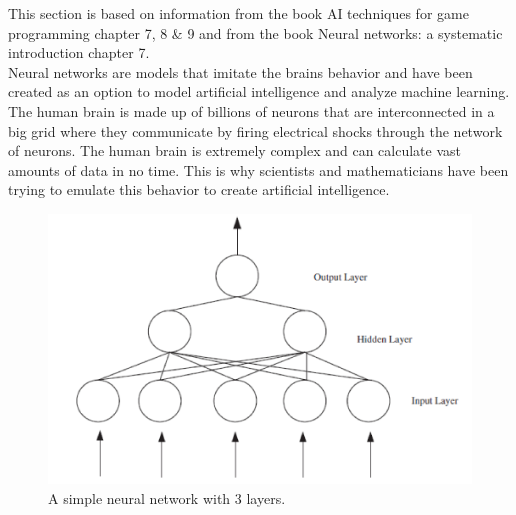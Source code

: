 This section is based on information from the book AI techniques for game programming\cite{buckland2002ai} chapter 7, 8 \& 9 and from the book Neural networks: a systematic introduction\cite{rojas1996neural} chapter 7.
\\[0.5cm]
Neural networks are models that imitate the brains behavior and have been created as an option to model artificial intelligence and analyze machine learning. The human brain is made up of billions of neurons that are interconnected in a big grid where they communicate by firing electrical shocks through the network of neurons. The human brain is extremely complex and can calculate vast amounts of data in no time. This is why scientists and mathematicians have been trying to emulate this behavior to create artificial intelligence.

\begin{figure}[!ht]
\centering
\includegraphics[width=0.8\linewidth]{billeder/ANN.png}
\caption{A simple neural network with 3 layers. \cite{stockForecasting}}
\label{fig:ANN}
\end{figure}

